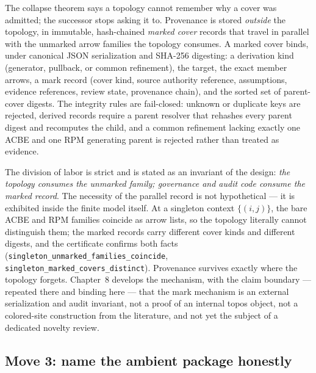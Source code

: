 The collapse theorem says a topology cannot remember why a cover was
admitted; the successor stops asking it to. Provenance is stored
\emph{outside} the topology, in immutable, hash-chained \emph{marked cover}
records that travel in parallel with the unmarked arrow families the
topology consumes. A marked cover binds, under canonical JSON serialization
and SHA-256 digesting: a derivation kind (generator, pullback, or common
refinement), the target, the exact member arrows, a mark record (cover kind,
source authority reference, assumptions, evidence references, review state,
provenance chain), and the sorted set of parent-cover digests. The integrity
rules are fail-closed: unknown or duplicate keys are rejected, derived
records require a parent resolver that rehashes every parent digest and
recomputes the child, and a common refinement lacking exactly one ACBE and
one RPM generating parent is rejected rather than treated as evidence.

The division of labor is strict and is stated as an invariant of the design:
\emph{the topology consumes the unmarked family; governance and audit code
consume the marked record}. The necessity of the parallel record is not
hypothetical --- it is exhibited inside the finite model itself. At a
singleton context $\{(i,j)\}$, the bare ACBE and RPM families coincide as
arrow lists, so the topology literally cannot distinguish them; the marked
records carry different cover kinds and different digests, and the
certificate confirms both facts
(\texttt{singleton\_unmarked\_families\_coincide},
\texttt{singleton\_marked\_covers\_distinct}). Provenance survives exactly
where the topology forgets. Chapter~8 develops the mechanism, with the
claim boundary --- repeated there and binding here --- that the mark
mechanism is an external serialization and audit invariant, not a proof of
an internal topos object, not a colored-site construction from the
literature, and not yet the subject of a dedicated novelty review.

\subsection{Move 3: name the ambient package honestly}\label{ch01:sec:move3}

